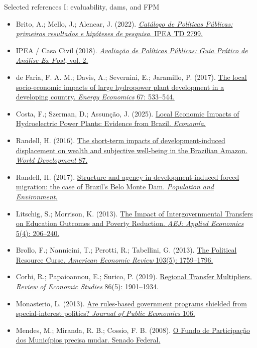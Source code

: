 \documentclass[aspectratio=169,10pt]{beamer}
\begin{document}
\begin{frame}{Selected references I: evaluability, dams, and FPM}
\tiny
\begin{itemize}\setlength\itemsep{0.35em}
  \item Brito, A.; Mello, J.; Alencar, J. (2022). \href{https://catalogo.ipea.gov.br/arquivos/posts/4565-td2799web.pdf}{\textit{Catálogo de Políticas Públicas: primeiros resultados e hipóteses de pesquisa}. IPEA TD 2799.}
  \item IPEA / Casa Civil (2018). \href{https://ipea.gov.br/portal/images/stories/PDFs/livros/livros/181218_avaliacao_de_politicas_publicas_vol2_guia_expost.pdf}{\textit{Avaliação de Políticas Públicas: Guia Prático de Análise Ex Post}, vol. 2.}
  \item de Faria, F. A. M.; Davis, A.; Severnini, E.; Jaramillo, P. (2017). \href{https://doi.org/10.1016/j.eneco.2017.08.025}{The local socio-economic impacts of large hydropower plant development in a developing country. \textit{Energy Economics} 67: 533--544.}
  \item Costa, F.; Szerman, D.; Assunção, J. (2025). \href{https://doi.org/10.31389/eco.466}{Local Economic Impacts of Hydroelectric Power Plants: Evidence from Brazil. \textit{Economía}.}
  \item Randell, H. (2016). \href{https://doi.org/10.1016/j.worlddev.2016.01.012}{The short-term impacts of development-induced displacement on wealth and subjective well-being in the Brazilian Amazon. \textit{World Development} 87.}
  \item Randell, H. (2017). \href{https://pmc.ncbi.nlm.nih.gov/articles/PMC5347396/}{Structure and agency in development-induced forced migration: the case of Brazil's Belo Monte Dam. \textit{Population and Environment}.}
  \item Litschig, S.; Morrison, K. (2013). \href{https://doi.org/10.1257/app.5.4.206}{The Impact of Intergovernmental Transfers on Education Outcomes and Poverty Reduction. \textit{AEJ: Applied Economics} 5(4): 206--240.}
  \item Brollo, F.; Nannicini, T.; Perotti, R.; Tabellini, G. (2013). \href{https://doi.org/10.1257/aer.103.5.1759}{The Political Resource Curse. \textit{American Economic Review} 103(5): 1759--1796.}
  \item Corbi, R.; Papaioannou, E.; Surico, P. (2019). \href{https://doi.org/10.1093/restud/rdy064}{Regional Transfer Multipliers. \textit{Review of Economic Studies} 86(5): 1901--1934.}
  \item Monasterio, L. (2013). \href{https://doi.org/10.1016/j.jpubeco.2012.11.001}{Are rules-based government programs shielded from special-interest politics? \textit{Journal of Public Economics} 106.}
  \item Mendes, M.; Miranda, R. B.; Cossio, F. B. (2008). \href{https://www12.senado.leg.br/publicacoes/estudos-legislativos/tipos-de-estudos/outras-publicacoes/volume-iv-constituicao-de-1988-o-brasil-20-anos-depois.-estado-e-economia-em-vinte-anos-de-mudancas/do-sistema-tributario-nacional-o-fundo-de-participacao-dos-municipios-precisa-mudar}{O Fundo de Participação dos Municípios precisa mudar. Senado Federal.}
\end{itemize}
\end{frame}
\end{document}
